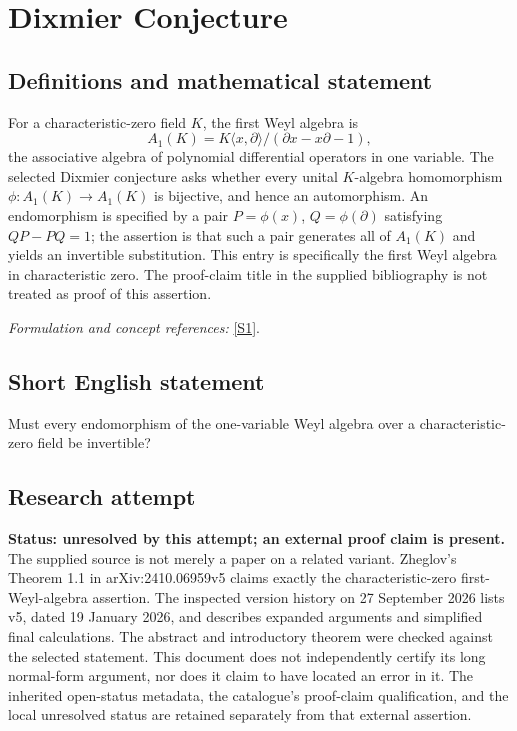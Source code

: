 \documentclass[11pt]{article}
\begin{document}
\section*{\texorpdfstring{Dixmier Conjecture}{Dixmier Conjecture}}\label{30006868}
\subsection{Definitions and mathematical statement}
For a characteristic-zero field $K$, the first Weyl algebra is
\[
 A_1(K)=K\langle x,\partial\rangle/(\partial x-x\partial-1),
\]
the associative algebra of polynomial differential operators in one variable. The selected Dixmier conjecture asks whether every unital $K$-algebra homomorphism $\phi:A_1(K)\to A_1(K)$ is bijective, and hence an automorphism. An endomorphism is specified by a pair $P=\phi(x)$, $Q=\phi(\partial)$ satisfying $QP-PQ=1$; the assertion is that such a pair generates all of $A_1(K)$ and yields an invertible substitution. This entry is specifically the first Weyl algebra in characteristic zero. The proof-claim title in the supplied bibliography is not treated as proof of this assertion.
\par\smallskip\textit{Formulation and concept references:} \href{https://arxiv.org/abs/2410.06959}{[S1]}.

\subsection{Short English statement}
Must every endomorphism of the one-variable Weyl algebra over a characteristic-zero field be invertible?
\subsection{Research attempt}
\textbf{Status: unresolved by this attempt; an external proof claim is present.} The supplied source is not merely a paper on a related variant. Zheglov's Theorem 1.1 in arXiv:2410.06959v5 claims exactly the characteristic-zero first-Weyl-algebra assertion. The inspected version history on 27 September 2026 lists v5, dated 19 January 2026, and describes expanded arguments and simplified final calculations. The abstract and introductory theorem were checked against the selected statement. This document does not independently certify its long normal-form argument, nor does it claim to have located an error in it. The inherited open-status metadata, the catalogue's proof-claim qualification, and the local unresolved status are retained separately from that external assertion.
\end{document}
